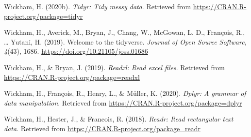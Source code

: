 \documentclass[
  english,
  man]{apa6}
\begin{document}
\leavevmode\hypertarget{ref-R-tidyr}{}%
Wickham, H. (2020b). \emph{Tidyr: Tidy messy data}. Retrieved from \url{https://CRAN.R-project.org/package=tidyr}

\leavevmode\hypertarget{ref-R-tidyverse}{}%
Wickham, H., Averick, M., Bryan, J., Chang, W., McGowan, L. D., François, R., \ldots{} Yutani, H. (2019). Welcome to the tidyverse. \emph{Journal of Open Source Software}, \emph{4}(43), 1686. \url{https://doi.org/10.21105/joss.01686}

\leavevmode\hypertarget{ref-R-readxl}{}%
Wickham, H., \& Bryan, J. (2019). \emph{Readxl: Read excel files}. Retrieved from \url{https://CRAN.R-project.org/package=readxl}

\leavevmode\hypertarget{ref-R-dplyr}{}%
Wickham, H., François, R., Henry, L., \& Müller, K. (2020). \emph{Dplyr: A grammar of data manipulation}. Retrieved from \url{https://CRAN.R-project.org/package=dplyr}

\leavevmode\hypertarget{ref-R-readr}{}%
Wickham, H., Hester, J., \& Francois, R. (2018). \emph{Readr: Read rectangular text data}. Retrieved from \url{https://CRAN.R-project.org/package=readr}

\endgroup
\end{document}
